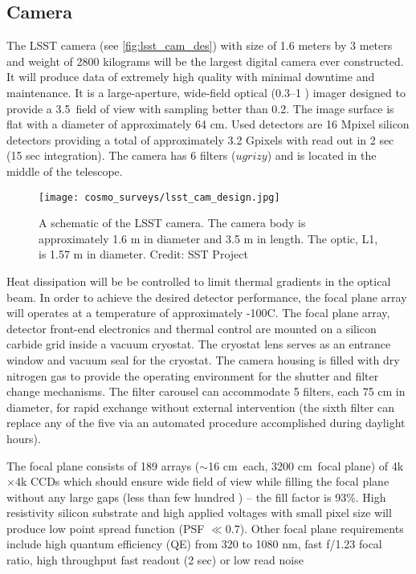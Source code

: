 \subsection{Camera}
The LSST camera (see \autoref{fig:lsst_cam_des}) with size of 1.6 meters by 3 meters and weight of 2800 kilograms will be the largest digital camera ever constructed. It will produce data of extremely high quality with minimal downtime and maintenance. It is a large-aperture, wide-field optical (0.3--1 \um) imager designed to provide a 3.5\textdegree\ field of view with sampling better than 0.2\arcsec. The image surface is flat with a diameter of approximately 64 cm. Used detectors are 16 Mpixel silicon detectors providing a total of approximately 3.2 Gpixels with read out in 2 sec (15 sec integration). The camera has 6 filters ($ugrizy$) and is located in the middle of the telescope.
\begin{figure}[ht]
    \centering
    \texttt{[image: cosmo\_surveys/lsst\_cam\_design.jpg]}
    \caption{A schematic of the LSST camera. The camera body is approximately 1.6 m in diameter and 3.5 m in length. The optic, L1, is 1.57 m in diameter. Credit: SST Project}
    \label{fig:lsst_cam_des}
\end{figure}

Heat dissipation will be be controlled to limit thermal gradients in the optical beam. In order to achieve the desired detector performance, the focal plane array will operates at a temperature of approximately -100\textdegree C. The focal plane array, detector front-end electronics and thermal control are mounted on a silicon carbide grid inside a vacuum cryostat. The cryostat lens serves as an entrance window and vacuum seal for the cryostat. The camera housing is filled with dry nitrogen gas to provide the operating environment for the shutter and filter change mechanisms. The filter carousel can accommodate 5 filters, each 75 cm in diameter, for rapid exchange without external intervention (the sixth filter can replace any of the five via an automated procedure accomplished during daylight hours).

The focal plane consists of 189 arrays ($\sim$16 cm\sq\ each, 3200 cm\sq\ focal plane) of 4k$\times$4k CCDs which should ensure wide field of view while filling the focal plane without any large gaps (less than few hundred \um) -- the fill factor is 93\%. High resistivity silicon substrate and high applied voltages with small pixel size will produce low point spread function (PSF $\ll0.7$\arcsec). Other focal plane requirements include high quantum efficiency (QE) from 320 to 1080 nm, fast f/1.23 focal ratio, high throughput fast readout (2 sec) or low read noise

